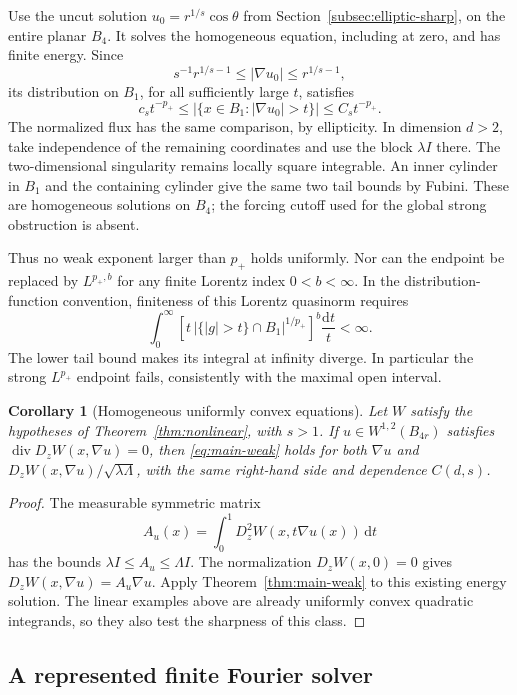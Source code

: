 \documentclass[11pt,a4paper]{article}
\numberwithin{equation}{section}
\newtheorem{corollary}[theorem]{Corollary}
\theoremstyle{definition}
\theoremstyle{remark}\newtheorem{remark}[theorem]{Remark}
\DeclareMathOperator{\diver}{div}
\newcommand{\Id}{I}
\begin{document}
Use the uncut solution \(u_0=r^{1/s}\cos\theta\) from
Section~\ref{subsec:elliptic-sharp}, on the entire planar \(B_4\).
It solves the homogeneous equation, including at zero, and has finite
energy. Since
\[
 s^{-1}r^{1/s-1}\leq|\nabla u_0|\leq r^{1/s-1},
\]
its distribution on \(B_1\), for all sufficiently large \(t\),
satisfies
\[
 c_s t^{-p_+}\leq
 |\{x\in B_1:|\nabla u_0|>t\}|\leq C_s t^{-p_+}.
\]
The normalized flux has the same comparison, by ellipticity.
In dimension \(d>2\), take independence of the remaining coordinates
and use the block \(\lambda\Id\) there. The two-dimensional
singularity remains locally square integrable. An inner cylinder
in \(B_1\) and the containing cylinder give the same two tail
bounds by Fubini. These are homogeneous solutions on \(B_4\);
the forcing cutoff used for the global strong obstruction is absent.

Thus no weak exponent larger than \(p_+\) holds uniformly.
Nor can the endpoint be replaced by \(L^{p_+,b}\) for any finite
Lorentz index \(0<b<\infty\). In the distribution-function convention,
finiteness of this Lorentz quasinorm requires
\[
 \int_0^\infty
 \left[t\,|\{|g|>t\}\cap B_1|^{1/p_+}\right]^b\frac{\mathrm dt}{t}
 <\infty.
\]
The lower tail bound makes its integral at infinity diverge.
In particular the strong \(L^{p_+}\) endpoint fails, consistently
with the maximal open interval.

\begin{corollary}[Homogeneous uniformly convex equations]
\label{cor:nonlinear-weak}
Let \(W\) satisfy the hypotheses of Theorem~\ref{thm:nonlinear},
with \(s>1\). If \(u\in W^{1,2}(B_{4r})\) satisfies
\(\diver D_zW(x,\nabla u)=0\), then \eqref{eq:main-weak} holds
for both \(\nabla u\) and \(D_zW(x,\nabla u)/\sqrt{\lambda\Lambda}\),
with the same right-hand side and dependence \(C(d,s)\).
\end{corollary}
\begin{proof}
The measurable symmetric matrix
\[
 A_u(x)=\int_0^1D_z^2W(x,t\nabla u(x))\,\mathrm dt
\]
has the bounds \(\lambda\Id\leq A_u\leq\Lambda\Id\).
The normalization \(D_zW(x,0)=0\) gives
\(D_zW(x,\nabla u)=A_u\nabla u\).
Apply Theorem~\ref{thm:main-weak} to this existing energy solution.
The linear examples above are already uniformly convex quadratic
integrands, so they also test the sharpness of this class.
\end{proof}



\subsection{A represented finite Fourier solver}
\end{document}

